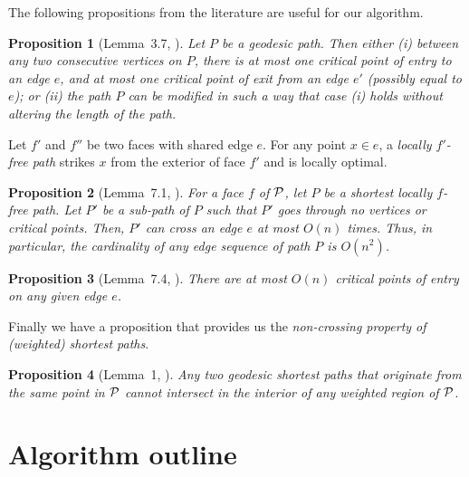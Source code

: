 \documentclass[11pt]{article}
\newtheorem{propo}{Proposition}
\begin{document}
The following propositions from the literature are useful for our algorithm.

\begin{propo}[Lemma~3.7, \cite{journals/jacm/MitchellP91}]
\label{prop:betwcrit}
Let $P$ be a geodesic path.
Then either (i) between any two consecutive vertices on $P$, there is at most one critical point of entry to an edge $e$, and at most one critical point of exit from an edge $e'$ (possibly equal to $e$); or
(ii) the path $P$ can be modified in such a way that case (i) holds without altering the length of the path. 
\end{propo}

Let $f'$ and $f''$ be two faces with shared edge $e$.
For any point $x \in e$, a {\it locally $f'$-free path} strikes $x$ from the exterior of face $f'$ and is locally optimal.

\begin{propo}[Lemma~7.1, \cite{journals/jacm/MitchellP91}]
\label{prop:edgeseqlen}
For a face $f$ of $\cal{P}$, let $P$ be a shortest locally $f$-free path.
Let $P'$ be a sub-path of $P$ such that $P'$ goes through no vertices or critical points.
Then, $P'$ can cross an edge $e$ at most $O(n)$ times.
Thus, in particular, the cardinality of any edge sequence of path $P$ is $O(n^2)$.
\end{propo}

\begin{propo}[Lemma~7.4, \cite{journals/jacm/MitchellP91}]
\label{prop:numcritsrc}
There are at most $O(n)$ critical points of entry on any given edge $e$.
\end{propo}
Finally we have a  proposition that provides us the {\it non-crossing property of (weighted) shortest paths}.
\begin{propo}[Lemma~1, \cite{journals/jal/SunR06}]
\label{prop:noncrossing}
Any two geodesic shortest paths that originate from the same point in $\cal{P}$ cannot intersect in the interior of any weighted region of $\cal{P}$.
\end{propo}

\section{Algorithm outline}
\label{sect:algooutline}
\end{document}
